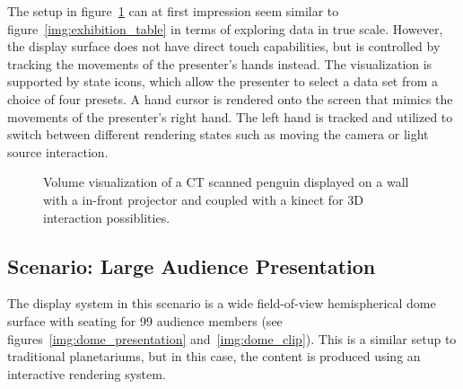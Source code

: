 \documentclass[review,journal]{vgtc}         %
\begin{document}
The setup in figure~\ref{img:exhibition_kinect} can at first impression seem similar to figure~\ref{img:exhibition_table} in terms of exploring data in true scale.
However, the display surface does not have direct touch capabilities, but is controlled by tracking the movements of the presenter's hands instead.
The visualization is supported by state icons, which allow the presenter to select a data set from a choice of four presets.
A hand cursor is rendered onto the screen that mimics the movements of the presenter's right hand.
The left hand is tracked and utilized to switch between different rendering states such as moving the camera or light source interaction.

\begin{figure}[htb]
	\centering
	\caption{Volume visualization of a CT scanned penguin displayed on a wall with a in-front projector and coupled with a kinect for 3D interaction possiblities.}
	\label{img:exhibition_kinect}
\end{figure}

\subsection{Scenario: Large Audience Presentation} \label{sec:largeaudience}
The display system in this scenario is a wide field-of-view hemispherical dome surface with seating for 99 audience members (see figures~\ref{img:dome_presentation} and~\ref{img:dome_clip}).
This is a similar setup to traditional planetariums, but in this case, the content is produced using an interactive rendering system.
\end{document}
